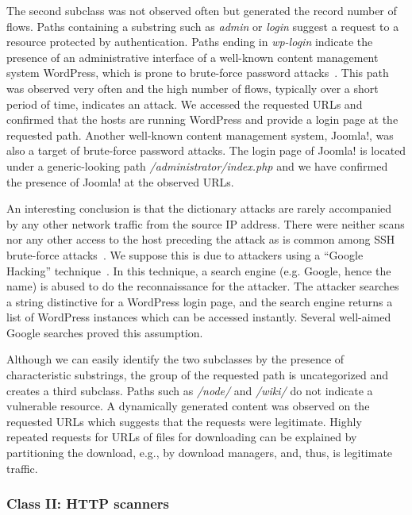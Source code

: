 The second subclass was not observed often but generated the record number of flows. Paths containing a substring such as \textit{admin} or \textit{login} suggest a request to a resource protected by authentication. Paths ending in \textit{wp-login} indicate the presence of an administrative interface of a well-known content management system WordPress, which is prone to brute-force password attacks~\cite{WordPressCodex-2014-Brute}. This path was observed very often and the high number of flows, typically over a short period of time, indicates an attack. We accessed the requested URLs and confirmed that the hosts are running WordPress and provide a login page at the requested path. Another well-known content management system, Joomla!, was also a target of brute-force password attacks. The login page of Joomla! is located under a generic-looking path \textit{/administrator/index.php} and we have confirmed the presence of Joomla! at the observed URLs.

An interesting conclusion is that the dictionary attacks are rarely accompanied by any other network traffic from the source IP address. There were neither scans nor any other access to the host preceding the attack as is common among SSH brute-force attacks~\cite{Vykopal-2013-Flow}. We suppose this is due to attackers using a ``Google Hacking'' technique~\cite{Billig-2008-Evaluation}. In this technique, a search engine (e.g. Google, hence the name) is abused to do the reconnaissance for the attacker. The attacker searches a string distinctive for a WordPress login page, and the search engine returns a list of WordPress instances which can be accessed instantly. Several well-aimed Google searches proved this assumption.

Although we can easily identify the two subclasses by the presence of characteristic substrings, the group of the requested path is uncategorized and creates a third subclass. Paths such as \textit{/node/} and \textit{/wiki/} do not indicate a vulnerable resource. A dynamically generated content was observed on the requested URLs which suggests that the requests were legitimate. Highly repeated requests for URLs of files for downloading can be explained by partitioning the download, e.g., by download managers, and, thus, is legitimate traffic.

\subsubsection{Class II: HTTP scanners}

